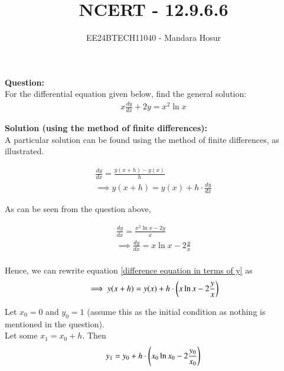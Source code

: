 \documentclass[journal]{IEEEtran}
\begin{document}

\vspace{3cm}

\title{NCERT - 12.9.6.6}
\author{EE24BTECH11040 - Mandara Hosur}
{\let\newpage\relax\maketitle}

\renewcommand{\thefigure}{\theenumi}
\renewcommand{\thetable}{\theenumi}
\setlength{\intextsep}{10pt} %


\renewcommand{\thetable}{\theenumi}

\textbf{Question:}\\
For the differential equation given below, find the general solution:
\begin{align}
x\frac{dy}{dx} + 2y = x^2\ln{x} \label{question}
\end{align}

\textbf{Solution (using the method of finite differences):} \\
A particular solution can be found using the method of finite differences, as illustrated.

\begin{align}
\frac{dy}{dx} = \frac{y(x+h) - y(x)}{h} \\
\implies y(x+h) = y(x) + h\cdot\frac{dy}{dx} \label{difference equation in terms of y}
\end{align}

As can be seen from the question above,

\begin{align}
\frac{dy}{dx} = \frac{x^2\ln{x} - 2y}{x} \\
\implies \frac{dy}{dx} = x\ln{x} - 2\frac{y}{x} \\
\end{align}

Hence, we can rewrite equation \eqref{difference equation in terms of y} as
\begin{align}
\implies y(x+h) = y(x) + h\cdot\left(x\ln{x} - 2\frac{y}{x}\right)
\end{align}

Let $x_0 = 0$ and $y_0 = 1$ (assume this as the initial condition as nothing is mentioned in the question). \\
Let some $x_1 = x_0 + h$. Then
\begin{align}
y_1 = y_0 + h\cdot\left(x_0\ln{x_0} - 2\frac{y_0}{x_0}\right) \label{initial difference equation}
\end{align}
\end{document}
